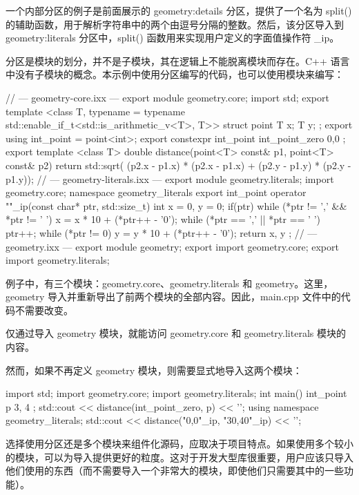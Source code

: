 一个内部分区的例子是前面展示的 geometry:details 分区，提供了一个名为 split() 的辅助函数，用于解析字符串中的两个由逗号分隔的整数。然后，该分区导入到 geometry:literals 分区中，split() 函数用来实现用户定义的字面值操作符 \_ip。


分区是模块的划分，并不是子模块，其在逻辑上不能脱离模块而存在。C++ 语言中没有子模块的概念。本示例中使用分区编写的代码，也可以使用模块来编写：

\begin{cpp}
// --- geometry-core.ixx ---
export module geometry.core;
import std;
export template <class T,
    typename = typename std::enable_if_t<std::is_arithmetic_v<T>, T>>
struct point
{
    T x;
    T y;
};
export using int_point = point<int>;
export constexpr int_point int_point_zero{ 0,0 };
export template <class T>
double distance(point<T> const& p1, point<T> const& p2)
{
    return std::sqrt(
        (p2.x - p1.x) * (p2.x - p1.x) +
        (p2.y - p1.y) * (p2.y - p1.y));
}
// --- geometry-literals.ixx ---
export module geometry.literals;
import geometry.core;
namespace geometry_literals
{
    export int_point operator ""_ip(const char* ptr, std::size_t)
    {
        int x = 0, y = 0;
        if(ptr)
        {
            while (*ptr != ',' && *ptr != ' ')
                x = x * 10 + (*ptr++ - '0');
            while (*ptr == ',' || *ptr == ' ') ptr++;
            while (*ptr != 0)
                y = y * 10 + (*ptr++ - '0');
        }
        return { x, y };
    }
}
// --- geometry.ixx ---
export module geometry;
export import geometry.core;
export import geometry.literals;
\end{cpp}

例子中，有三个模块：geometry.core、geometry.literals 和 geometry。这里，geometry 导入并重新导出了前两个模块的全部内容。因此，main.cpp 文件中的代码不需要改变。

仅通过导入 geometry 模块，就能访问 geometry.core 和 geometry.literals 模块的内容。

然而，如果不再定义 geometry 模块，则需要显式地导入这两个模块：

\begin{cpp}
import std;
import geometry.core;
import geometry.literals;
int main()
{
    int_point p{ 3, 4 };
    std::cout << distance(int_point_zero, p) << '\n';
    {
        using namespace geometry_literals;
        std::cout << distance("0,0"_ip, "30,40"_ip) << '\n';
    }
}
\end{cpp}

选择使用分区还是多个模块来组件化源码，应取决于项目特点。如果使用多个较小的模块，可以为导入提供更好的粒度。这对于开发大型库很重要，用户应该只导入他们使用的东西（而不需要导入一个非常大的模块，即使他们只需要其中的一些功能）。


